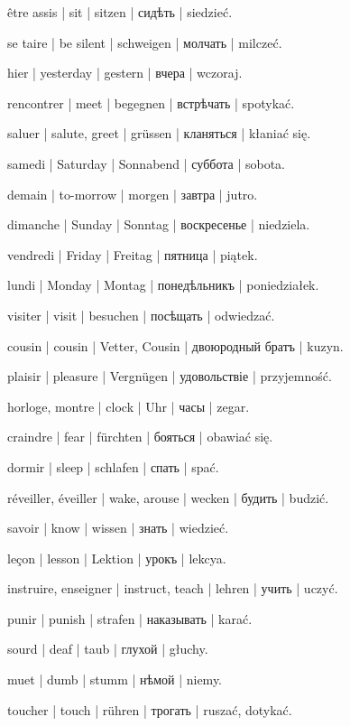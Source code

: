 \begin{ekzvocab}{1em}
 être assis | sit | sitzen | сидѣть | siedzieć.

 se taire | be silent | schweigen | молчать | milczeć.

 hier | yesterday | gestern | вчера | wczoraj.

 rencontrer | meet | begegnen | встрѣчать | spotykać.

 saluer | salute, greet | grüssen | кланяться | kłaniać się.

 samedi | Saturday | Sonnabend | суббота | sobota.

 demain | to-morrow | morgen | завтра | jutro.

 dimanche | Sunday | Sonntag | воскресенье | niedziela.

 vendredi | Friday | Freitag | пятница | piątek.

 lundi | Monday | Montag | понедѣльникъ | poniedziałek.

 visiter | visit | besuchen | посѣщать | odwiedzać.

 cousin | cousin | Vetter, Cousin | двоюродный братъ | kuzyn.

 plaisir | pleasure | Vergnügen | удовольствіе | przyjemność.

 horloge, montre | clock | Uhr | часы | zegar.

 craindre | fear | fürchten | бояться | obawiać się.

 dormir | sleep | schlafen | спать | spać.

 réveiller, éveiller | wake, arouse | wecken | будить | budzić.

 savoir | know | wissen | знать | wiedzieć.

 leçon | lesson | Lektion | урокъ | lekcya.

 instruire, enseigner | instruct, teach | lehren | учить | uczyć.

 punir | punish | strafen | наказывать | karać.

 sourd | deaf | taub | глухой | głuchy.

 muet | dumb | stumm | нѣмой | niemy.

 toucher | touch | rühren | трогать | ruszać, dotykać.


\end{ekzvocab}
